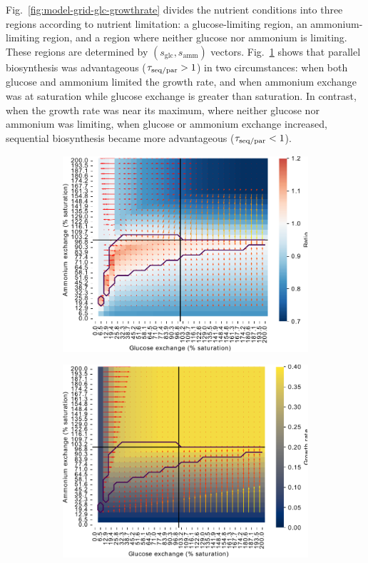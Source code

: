 Fig.\ \ref{fig:model-grid-glc-growthrate} divides the nutrient conditions into three regions according to nutrient limitation: a glucose-limiting region, an ammonium-limiting region, and a region where neither glucose nor ammonium is limiting.
These regions are determined by $(s_{\mathrm{glc}}, s_{\mathrm{amm}})$ vectors.
Fig.\ \ref{fig:model-grid-glc-ratio} shows that parallel biosynthesis was advantageous ($\tau_{\mathrm{seq}/\mathrm{par}} > 1$) in two circumstances: when both glucose and ammonium limited the growth rate, and when ammonium exchange was at saturation while glucose exchange is greater than saturation.
In contrast, when the growth rate was near its maximum, where neither glucose nor ammonium was limiting, when glucose or ammonium exchange increased, sequential biosynthesis became more advantageous ($\tau_{\mathrm{seq}/\mathrm{par}} < 1$).

\begin{figure}
  \centering
  \begin{subfigure}[t]{0.45\textwidth}
  \centering
    \includegraphics[width=\linewidth]{ec_grid_glc_amm_ratio}
    \caption{
    }
    \label{fig:model-grid-glc-ratio}
  \end{subfigure}%
  \begin{subfigure}[t]{0.45\textwidth}
  \centering
    \includegraphics[width=\linewidth]{ec_grid_glc_amm_gr}

\end{subfigure}
\end{figure}
